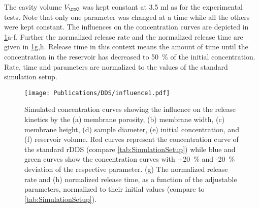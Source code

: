 The cavity volume $V_\rmC$ was kept constant at 3.5 ml as for the experimental tests. Note that only one parameter was changed at a time while all the others were kept constant. The influences on the concentration curves are depicted in \mbox{\cref{fig:influence1}a-f}. Further the normalized release rate and the normalized release time are given in \mbox{\cref{fig:influence1}g,h}. Release time in this context means the amount of time until the concentration in the reservoir has decreased to 50~\% of the initial concentration. Rate, time and parameters are normalized to the values of the standard simulation setup. 
\begin{figure}[h!]
  \centering
  \texttt{[image: Publications/DDS/influence1.pdf]}
  \caption{Simulated concentration curves showing the influence on the release kinetics by the (a) membrane porosity, (b) membrane width, (c) membrane height, (d) sample diameter, (e) initial concentration, and (f) reservoir volume. Red curves represent the concentration curve of the standard rDDS (compare \cref{tab:SimulationSetup}) while blue and green curves show the concentration curves with +20~\% and -20~\% deviation of the respective parameter. (g) The normalized release rate and (h) normalized release time, as a function of the adjustable parameters, normalized to their initial values (compare to
  \cref{tab:SimulationSetup}).}
  \label{fig:influence1}
\end{figure}

